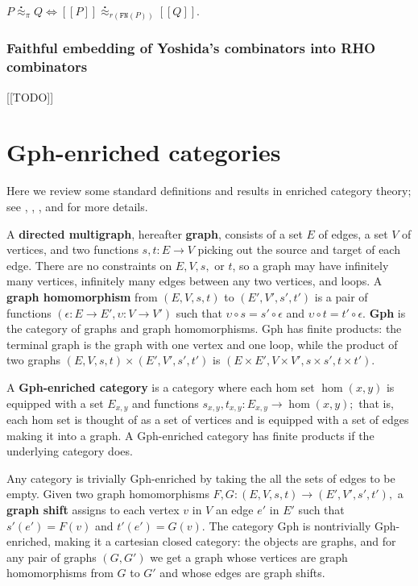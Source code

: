 \documentclass{llncs}
\newcommand{\maps}{\colon}
\newcommand{\ldb}{[\![}
\newcommand{\rdb}{]\!]}
\newcommand{\wbbisim}{\stackrel{\centerdot}{\approx}} %
\begin{document}
	$P \wbbisim_{\pi} Q \iff \ldb P \rdb \wbbisim_{r(\texttt{FN}(P))} \ldb Q \rdb$.

\subsubsection{Faithful embedding of Yoshida's combinators into RHO combinators}
[[TODO]]

\section{Gph-enriched categories}
Here we review some standard definitions and results in enriched category theory; see \cite{CIS-335497}, \cite{Power99EnrichedLawvereTheories}, \cite{DBLP:journals/acs/LackR11}, and \cite{Trimble} for more details.

A {\bf directed multigraph}, hereafter {\bf graph}, consists of a set $E$ of edges, a set $V$ of vertices, and two functions $s,t\maps E \to V$ picking out the source and target of each edge.  There are no constraints on $E, V, s,$ or $t$, so a graph may have infinitely many vertices, infinitely many edges between any two vertices, and loops.  A {\bf graph homomorphism} from $(E, V, s, t)$ to $(E', V', s', t')$ is a pair of functions $(\epsilon\maps E \to E', \upsilon\maps V \to V')$ such that $\upsilon\circ s = s' \circ \epsilon$ and $\upsilon\circ t = t' \circ \epsilon$.  {\bf Gph} is the category of graphs and graph homomorphisms.  Gph has finite products: the terminal graph is the graph with one vertex and one loop, while the product of two graphs $(E, V, s, t) \times (E', V', s', t')$ is $(E \times E', V \times V', s \times s', t\times t').$

A {\bf Gph-enriched category} is a category where each hom set $\hom(x,y)$ is equipped with a set $E_{x,y}$ and functions $s_{x,y}, t_{x,y}\maps E_{x,y} \to \hom(x,y);$ that is, each hom set is thought of as a set of vertices and is equipped with a set of edges making it into a graph.  A Gph-enriched category has finite products if the underlying category does.

Any category is trivially Gph-enriched by taking the all the sets of edges to be empty.  Given two graph homomorphisms $F, G\maps (E, V, s, t) \to (E', V', s', t'),$ a {\bf graph shift} assigns to each vertex $v$ in $V$ an edge $e'$ in $E'$ such that $s'(e') = F(v)$ and $t'(e') = G(v).$  The category Gph is nontrivially Gph-enriched, making it a cartesian closed category: the objects are graphs, and for any pair of graphs $(G, G')$ we get a graph whose vertices are graph homomorphisms from $G$ to $G'$ and whose edges are graph shifts.
\end{document}
